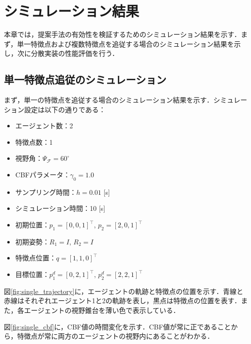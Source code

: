\section{シミュレーション結果}

本章では，提案手法の有効性を検証するためのシミュレーション結果を示す．まず，単一特徴点および複数特徴点を追従する場合のシミュレーション結果を示し，次に分散実装の性能評価を行う．

\subsection{単一特徴点追従のシミュレーション}

まず，単一の特徴点を追従する場合のシミュレーション結果を示す．シミュレーション設定は以下の通りである：
\begin{itemize}
\item エージェント数：2
\item 特徴点数：1
\item 視野角：$\Psi_\mathcal{F} = 60^\circ$
\item CBFパラメータ：$\gamma_0 = 1.0$
\item サンプリング時間：$h = 0.01$ [s]
\item シミュレーション時間：10 [s]
\item 初期位置：$p_1 = [0, 0, 1]^\top$, $p_2 = [2, 0, 1]^\top$
\item 初期姿勢：$R_1 = I$, $R_2 = I$
\item 特徴点位置：$q = [1, 1, 0]^\top$
\item 目標位置：$p_1^d = [0, 2, 1]^\top$, $p_2^d = [2, 2, 1]^\top$
\end{itemize}

図\ref{fig:single_trajectory}に，エージェントの軌跡と特徴点の位置を示す．青線と赤線はそれぞれエージェント1と2の軌跡を表し，黒点は特徴点の位置を表す．また，各エージェントの視野錐台を薄い色で表示している．


図\ref{fig:single_cbf}に，CBF値の時間変化を示す．CBF値が常に正であることから，特徴点が常に両方のエージェントの視野内にあることがわかる．


